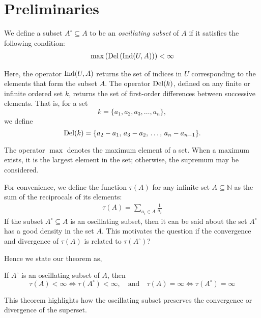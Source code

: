 \section{Preliminaries}

We define a subset $A^{\circ} \subseteq A$ to be an \emph{oscillating subset} of $A$ if it satisfies the following condition:
\begin{align}
\max \left( \operatorname{Del}\left( \operatorname{Ind}(U, A) \right) \right) < \infty
\end{align}

Here, the operator $\operatorname{Ind}(U, A)$ returns the set of indices in $U$ corresponding to the elements that form the subset $A$. The operator $\operatorname{Del}(k)$, defined on any finite or infinite ordered set $k$, returns the set of first-order differences between successive elements. That is, for a set
\[
k = \{ a_1, a_2, a_3, \dots, a_n \},
\]
we define
\[
\operatorname{Del}(k) = \{ a_2 - a_1,\, a_3 - a_2,\, \dots,\, a_n - a_{n-1} \}.
\]

The operator $\max$ denotes the maximum element of a set. When a maximum exists, it is the largest element in the set; otherwise, the supremum may be considered.

\vspace{1em}

For convenience, we define the function $\tau(A)$ for any infinite set $A \subseteq \mathbb{N}$ as the sum of the reciprocals of its elements:
\begin{align}
\tau(A) = \sum_{a_i \in A} \frac{1}{a_i}
\end{align}
If the subset $A^{\circ} \subseteq A$ is an oscillating subset, then it can be said about the set $A^{\circ}$ has a good density in the set $A$.
This motivates the question if the convergence and divergence of $\tau(A)$ is related to $\tau(A^{\circ})$?

Hence we state our theorem as,
\begin{theorem}
If $A^{\circ}$ is an oscillating subset of $A$, then 
\[
\tau(A) < \infty \iff \tau(A^\circ) < \infty, \quad \text{and} \quad \tau(A) = \infty \iff \tau(A^\circ) = \infty
\]
\end{theorem}

This theorem highlights how the oscillating subset preserves the convergence or divergence of the superset.

